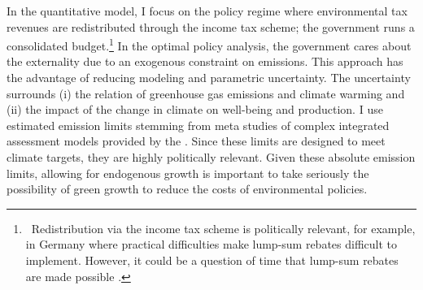 In the quantitative model, I focus on the policy regime where environmental tax revenues are redistributed through the income tax scheme; the government runs a consolidated budget.\footnote{\  Redistribution via the income tax scheme is politically relevant, for example, in Germany where practical difficulties make lump-sum rebates difficult to implement. However, it could be a question of time that lump-sum rebates are made possible \citep{ZeitArt}.}
In the optimal policy analysis, the government cares about the externality due to an exogenous constraint on emissions. This approach has the advantage of reducing modeling and parametric uncertainty. The uncertainty surrounds (i) the relation of greenhouse gas emissions and climate warming and (ii) the impact of the change in climate on well-being and production. I use estimated emission limits stemming from meta studies of complex integrated assessment models provided by the \cite{IPCC2022}. Since these limits are designed to meet climate targets, they are highly politically relevant.  
Given these absolute emission limits, allowing for endogenous growth is important to take seriously the possibility of green growth to reduce the costs of environmental policies. %



